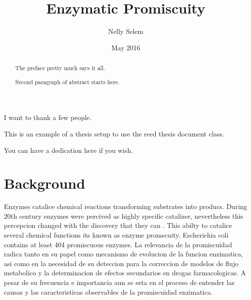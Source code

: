\documentclass[12pt,twoside]{reedthesis}
\title{Enzymatic Promiscuity}
\author{Nelly Selem}
\date{May 2016}
\begin{document}
      \maketitle
  
  \frontmatter %
  \pagestyle{empty} %

      \begin{acknowledgements}
      I want to thank a few people.
    \end{acknowledgements}
  
      \begin{preface}
      This is an example of a thesis setup to use the reed thesis document
      class.
    \end{preface}
  
      \hypersetup{linkcolor=black}
    \setcounter{tocdepth}{3}
    \tableofcontents
  
      \listoftables
  
      \listoffigures
  
      \begin{abstract}
      The preface pretty much says it all. \par  Second paragraph of abstract
      starts here.
    \end{abstract}
  
      \begin{dedication}
      You can have a dedication here if you wish.
    \end{dedication}
  
  \mainmatter %
  \pagestyle{fancyplain} %

  \chapter*{Background}\label{background}
  
  Enzymes catalice chemical reactions transforming substrates into
  producs. During 20th century enzymes were percived as highly specific
  catalizer, nevertheless this percepcion changed with the discovery that
  they can . This abilty to catalice several chemical functions its known
  as enzyme promscuity. Escherichia coli contains at least 404 promiscuous
  enzymes. La relevancia de la promiscuidad radica tanto en su papel como
  mecanismo de evolucion de la funcion enzimatica, asi como en la
  necesidad de su deteccion para la correccion de modelos de flujo
  metabolico y la determinacion de efectos secundarios en drogas
  farmacologicas. A pesar de su frecuencia e importancia aun se esta en el
  proceso de entender las causas y las caracteristicas observables de la
  promiscuidad enzimatica.
  
\end{document}
